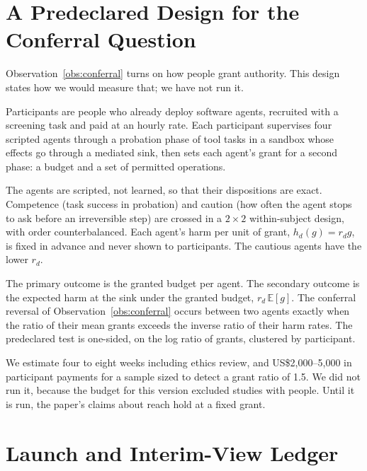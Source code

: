 


\section{A Predeclared Design for the Conferral Question}\label{app:v6conferral}

Observation~\ref{obs:conferral} turns on how people grant authority. This design states how we would measure that;
we have not run it.

 Participants are people who already deploy software agents, recruited with a screening
task and paid at an hourly rate. Each participant supervises four scripted agents through a probation phase of tool
tasks in a sandbox whose effects go through a mediated sink, then sets each agent's grant for a second phase: a
budget and a set of permitted operations.

 The agents are scripted, not learned, so that their dispositions are exact. Competence (task
success in probation) and caution (how often the agent stops to ask before an irreversible step) are crossed in a
\(2 \times 2\) within-subject design, with order counterbalanced. Each agent's harm per unit of grant, \(h_d(g) = r_d
g\), is fixed in advance and never shown to participants. The cautious agents have the lower \(r_d\).

 The primary outcome is the granted budget per agent. The secondary outcome is the expected harm at
the sink under the granted budget, \(r_d\,\mathbb{E}[g]\). The conferral reversal of
Observation~\ref{obs:conferral} occurs between two agents exactly when the ratio of their mean grants exceeds the
inverse ratio of their harm rates. The predeclared test is one-sided, on the log ratio of grants, clustered by
participant.

 We estimate four to eight weeks including ethics review, and US\$2,000--5,000 in participant
payments for a sample sized to detect a grant ratio of 1.5. We did not run it, because the budget for this version
excluded studies with people. Until it is run, the paper's claims about reach hold at a fixed grant.

\section{Launch and Interim-View Ledger}\label{app:v6ledger}

